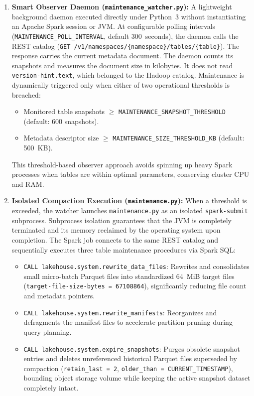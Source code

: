 \begin{enumerate}
    \item \textbf{Smart Observer Daemon (\texttt{maintenance\_watcher.py}):} A lightweight background daemon executed directly under Python~3 without instantiating an Apache Spark session or JVM. At configurable polling intervals (\texttt{MAINTENANCE\_POLL\_INTERVAL}, default 300~seconds), the daemon calls the REST catalog (\texttt{GET /v1/namespaces/\{namespace\}/tables/\{table\}}). The response carries the current metadata document. The daemon counts its snapshots and measures the document size in kilobytes. It does not read \texttt{version-hint.text}, which belonged to the Hadoop catalog. Maintenance is dynamically triggered only when either of two operational thresholds is breached:
    \begin{itemize}
        \item Monitored table snapshots $\ge$ \texttt{MAINTENANCE\_SNAPSHOT\_THRESHOLD} (default: 600 snapshots).
        \item Metadata descriptor size $\ge$ \texttt{MAINTENANCE\_SIZE\_THRESHOLD\_KB} (default: 500~KB).
    \end{itemize}
    This threshold-based observer approach avoids spinning up heavy Spark processes when tables are within optimal parameters, conserving cluster CPU and RAM.

    \item \textbf{Isolated Compaction Execution (\texttt{maintenance.py}):} When a threshold is exceeded, the watcher launches \texttt{maintenance.py} as an isolated \texttt{spark-submit} subprocess. Subprocess isolation guarantees that the JVM is completely terminated and its memory reclaimed by the operating system upon completion. The Spark job connects to the same REST catalog and sequentially executes three table maintenance procedures via Spark SQL:
    \begin{itemize}
        \item \texttt{CALL lakehouse.system.rewrite\_data\_files}: Rewrites and consolidates small micro-batch Parquet files into standardized 64~MiB target files (\texttt{target-file-size-bytes = 67108864}), significantly reducing file count and metadata pointers.
        \item \texttt{CALL lakehouse.system.rewrite\_manifests}: Reorganizes and defragments the manifest files to accelerate partition pruning during query planning.
        \item \texttt{CALL lakehouse.system.expire\_snapshots}: Purges obsolete snapshot entries and deletes unreferenced historical Parquet files superseded by compaction (\texttt{retain\_last = 2}, \texttt{older\_than = CURRENT\_TIMESTAMP}), bounding object storage volume while keeping the active snapshot dataset completely intact.
    \end{itemize}
\end{enumerate}

